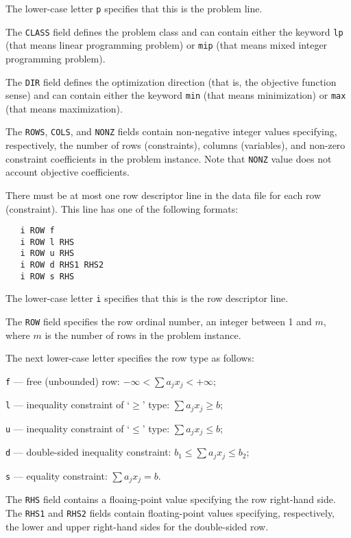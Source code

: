 The lower-case letter \verb|p| specifies that this is the problem line.

The \verb|CLASS| field defines the problem class and can contain either
the keyword \verb|lp| (that means linear programming problem) or
\verb|mip| (that means mixed integer programming problem).

The \verb|DIR| field defines the optimization direction (that is, the
objective function sense) and can contain either the keyword \verb|min|
(that means minimization) or \verb|max| (that means maximization).

The \verb|ROWS|, \verb|COLS|, and \verb|NONZ| fields contain
non-negative integer values specifying, respectively, the number of
rows (constraints), columns (variables), and non-zero constraint
coefficients in the problem instance. Note that \verb|NONZ| value does
not account objective coefficients.

 There must be at most one row descriptor line
in the data file for each row (constraint). This line has one of the
following formats:

\begin{verbatim}
   i ROW f
   i ROW l RHS
   i ROW u RHS
   i ROW d RHS1 RHS2
   i ROW s RHS
\end{verbatim}

The lower-case letter \verb|i| specifies that this is the row
descriptor line.

The \verb|ROW| field specifies the row ordinal number, an integer
between 1 and $m$, where $m$ is the number of rows in the problem
instance.

The next lower-case letter specifies the row type as follows:

\verb|f| --- free (unbounded) row: $-\infty<\sum a_jx_j<+\infty$;

\verb|l| --- inequality constraint of `$\geq$' type:
$\sum a_jx_j\geq b$;

\verb|u| --- inequality constraint of `$\leq$' type:
$\sum a_jx_j\leq b$;

\verb|d| --- double-sided inequality constraint:
$b_1\leq\sum a_jx_j\leq b_2$;

\verb|s| --- equality constraint: $\sum a_jx_j=b$.

The \verb|RHS| field contains a floaing-point value specifying the
row right-hand side. The \verb|RHS1| and \verb|RHS2| fields contain
floating-point values specifying, respectively, the lower and upper
right-hand sides for the double-sided row.

